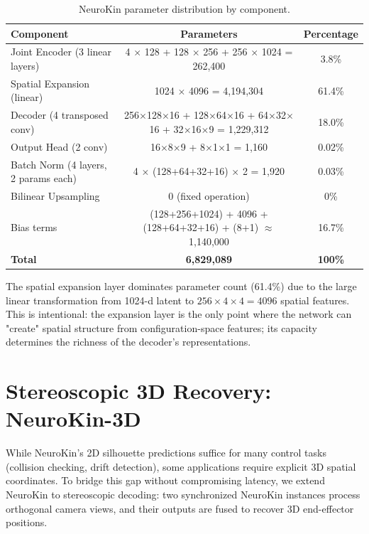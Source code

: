 \documentclass[12pt,a4paper,oneside]{report}
\begin{document}
\begin{table}[H]
\centering
\caption{NeuroKin parameter distribution by component.}
\label{tab:neurokin_params}
\begin{tabular}{lcc}
\toprule
Component & Parameters & Percentage \\
\midrule
Joint Encoder (3 linear layers) & 4 $\times$ 128 + 128 $\times$ 256 + 256 $\times$ 1024 = 262,400 & 3.8\% \\
Spatial Expansion (linear) & 1024 $\times$ 4096 = 4,194,304 & 61.4\% \\
Decoder (4 transposed conv) & 256$\times$128$\times$16 + 128$\times$64$\times$16 + 64$\times$32$\times$16 + 32$\times$16$\times$9 = 1,229,312 & 18.0\% \\
Output Head (2 conv) & 16$\times$8$\times$9 + 8$\times$1$\times$1 = 1,160 & 0.02\% \\
Batch Norm (4 layers, 2 params each) & 4 $\times$ (128+64+32+16) $\times$ 2 = 1,920 & 0.03\% \\
Bilinear Upsampling & 0 (fixed operation) & 0\% \\
Bias terms & (128+256+1024) + 4096 + (128+64+32+16) + (8+1) $\approx$ 1,140,000 & 16.7\% \\
\midrule
\textbf{Total} & \textbf{6,829,089} & \textbf{100\%} \\
\bottomrule
\end{tabular}
\end{table}

The spatial expansion layer dominates parameter count (61.4\%) due to the large linear transformation from 1024-d latent to $256 \times 4 \times 4 = 4096$ spatial features. This is intentional: the expansion layer is the only point where the network can "create" spatial structure from configuration-space features; its capacity determines the richness of the decoder's representations.

\section{Stereoscopic 3D Recovery: NeuroKin-3D}

While NeuroKin's 2D silhouette predictions suffice for many control tasks (collision checking, drift detection), some applications require explicit 3D spatial coordinates. To bridge this gap without compromising latency, we extend NeuroKin to stereoscopic decoding: two synchronized NeuroKin instances process orthogonal camera views, and their outputs are fused to recover 3D end-effector positions.
\end{document}
